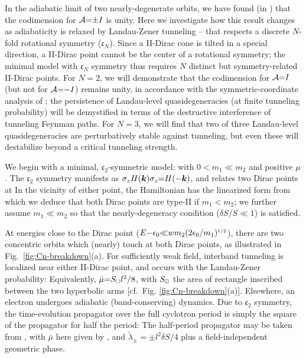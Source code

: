 \documentclass[aps, showpacs, twocolumn, notitlepage, superscriptaddress]{revtex4-1}
\begin{document}
In the adiabatic limit of two nearly-degenerate orbits, we have found (in ) that the codimension for ${\cal A}{=}{\pm} I$ is unity. Here we investigate how this result changes as adiabaticity is relaxed by Landau-Zener tunneling -- that respects a discrete $N$-fold rotational symmetry ($\mathfrak{c}_N$). Since a II-Dirac cone is tilted in a special direction, a II-Dirac point cannot be the center of a rotational symmetry; the minimal model with $\mathfrak{c}_N$ symmetry thus requires $N$ distinct but symmetry-related II-Dirac points. For $N{=}2$, we will demonstrate that the codimension for ${\cal A}{=}I$ (but not for ${\cal A}{=}{-}I$) remains unity, in accordance with the symmetric-coordinate analysis of ; the persistence of  Landau-level quasidegeneracies  (at finite tunneling probability) will be demystified in terms of the destructive interference of tunneling Feynman paths. For $N{=}3$, we will find that two of three Landau-level quasidegeneracies are perturbatively stable against tunneling, but even these will destabilize beyond a critical tunneling strength.

We begin with a minimal, $\mathfrak{c}_2$-symmetric model:
with $0{<}m_1{\ll}m_2$ and positive $\mu$.  The $\mathfrak{c}_2$ symmetry manifests as $\sigma_z H(\boldsymbol{k})\sigma_z{=}H({-}\boldsymbol{k})$, and relates 
two Dirac points at
In the vicinity of either point, the  Hamiltonian has the linearized form 
from which we deduce that both Dirac points are  type-II if $m_1{<}m_2$; we further assume $m_1{\ll}m_2$ so that the nearly-degeneracy condition ($\delta S/S{\ll}1$) is satisfied. 

At energies close to the Dirac point ($E{-}\epsilon_0 {\ll} wm_2(2\epsilon_0/m_1)^{\scriptscriptstyle{1/2}}$), there are two concentric orbits which (nearly) touch at both Dirac points, as illustrated in Fig.\ \ref{fig:Cn-breakdown}(a). For sufficiently weak field, interband tunneling is localized near either II-Dirac point, and occurs with the Landau-Zener probability:
Equivalently, $\bar{\mu}{=}S_{\scriptscriptstyle{\square}}l^2/8$, with $S_{\scriptscriptstyle{\square}}$ the area of rectangle inscribed between the two hyperbolic arms [cf.\  Fig. \ref{fig:Cn-breakdown}(a)]. Elsewhere, an electron undergoes adiabatic (band-conserving) dynamics. Due to $\mathfrak{c}_2$ symmetry, the time-evolution propagator over the full cyclotron period is simply the square of the propagator for half the period: 
The half-period propagator may be taken from , with  $\bar{\mu}$ here given by , and  $\tilde{\lambda}_{\pm}{=}{\pm}l^2\delta S/4$ plus a field-independent geometric phase.
\end{document}
